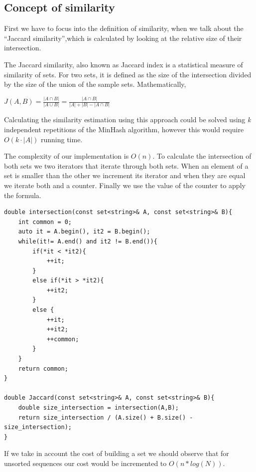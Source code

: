 \documentclass[12pt]{article}
\begin{document}
\subsection{Concept of similarity}
First we have to focus into the definition of similarity, when we talk about the ``Jaccard similarity'',which is calculated by looking at the relative size of their intersection. 

The Jaccard similarity, also known as Jaccard index is a statistical measure of similarity of sets. For two sets, it is defined as the size of the intersection divided by the size of the union of the sample sets. Mathematically,
\bigbreak
\centerline{\large $J(A,B)=\frac{\left |A\cap B  \right |}{ \left |A\cup B  \right |} = \frac{\left |A\cap B  \right |}{ \left|A\right|+\left|B\right|-\left |A\cap B  \right |} $}
\bigbreak

Calculating the similarity estimation using this approach could be solved using \textit{k} independent repetitions of the MinHash algorithm, however this would require $O(k \cdot |A|)$ running time. 

The complexity of our implementation is $O(n)$. To calculate the intersection of both sets we two iterators that iterate through both sets. When an element of a set is smaller than the other we increment its iterator and when they are equal we iterate both and a counter. Finally we use the value of the counter to apply the formula. 
\lstset{language= C++}
\begin{lstlisting}
double intersection(const set<string>& A, const set<string>& B){
	int common = 0; 
	auto it = A.begin(), it2 = B.begin();
	while(it!= A.end() and it2 != B.end()){
		if(*it < *it2){
			++it;
		}
		else if(*it > *it2){
			++it2;
		}
		else {
			++it;
			++it2;
			++common;
		}
	}
	return common; 
}

double Jaccard(const set<string>& A, const set<string>& B){
	double size_intersection = intersection(A,B);
	return size_intersection / (A.size() + B.size() - size_intersection);
}

\end{lstlisting}

If we take in account the cost of building a set we should observe that for unsorted sequences our cost would be incremented to $O(n*log(N))$.


\end{document}
